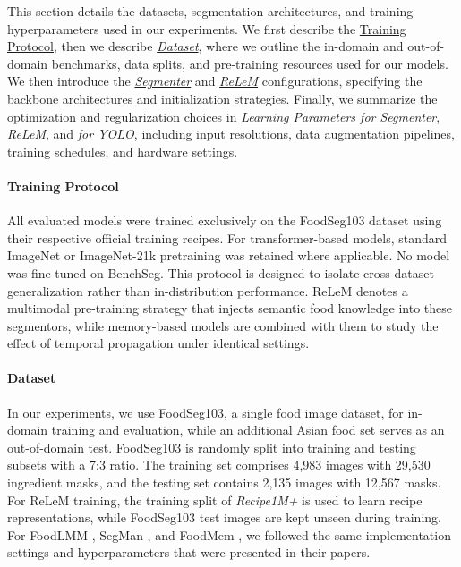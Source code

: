 \documentclass[preprint,12pt]{elsarticle}
\begin{document}
This section details the datasets, segmentation architectures, and training hyperparameters used in our experiments.
We first describe the \hyperref[par:training_protocol]{Training Protocol}, then we describe \hyperref[par:dataset]{\textit{Dataset}}, where we outline the in-domain and out-of-domain benchmarks, data splits, and pre-training resources used for our models.
We then introduce the \hyperref[par:segmenter]{\textit{Segmenter}} and \hyperref[par:relem]{\textit{ReLeM}} configurations, specifying the backbone architectures and initialization strategies.
Finally, we summarize the optimization and regularization choices in \hyperref[par:learn-seg]{\textit{Learning Parameters for Segmenter}}, \hyperref[par:learn-relem]{\textit{ReLeM}}, and \hyperref[par:learn-yolo]{\textit{for YOLO}}, including input resolutions, data augmentation pipelines, training schedules, and hardware settings.

\paragraph{Training Protocol}
\label{par:training_protocol}
All evaluated models were trained exclusively on the FoodSeg103 dataset using their respective official training recipes. For transformer-based models, standard ImageNet or ImageNet-21k pretraining was retained where applicable. No model was fine-tuned on BenchSeg. This protocol is designed to isolate cross-dataset generalization rather than in-distribution performance. ReLeM \cite{wu2021large} denotes a multimodal pre-training strategy that injects semantic food knowledge into these segmentors, while memory-based models are combined with them to study the effect of temporal propagation under identical settings.


\paragraph{Dataset}
\label{par:dataset}
In our experiments, we use FoodSeg103, a single food image dataset, for in-domain training and evaluation, while an additional Asian food set serves as an out-of-domain test. FoodSeg103\cite{wu2021large} is randomly split into training and testing subsets with a 7:3 ratio. The training set comprises 4,983 images with 29,530 ingredient masks, and the testing set contains 2,135 images with 12,567 masks. For ReLeM training, the training split of \textit{Recipe1M+} is used to learn recipe representations, while FoodSeg103 test images are kept unseen during training. For FoodLMM \cite{yin2025foodlmm}, SegMan \cite{fu2025segman}, and FoodMem \cite{almughrabi2025foodmem}, we followed the same implementation settings and hyperparameters that were presented in their papers. 
\end{document}
